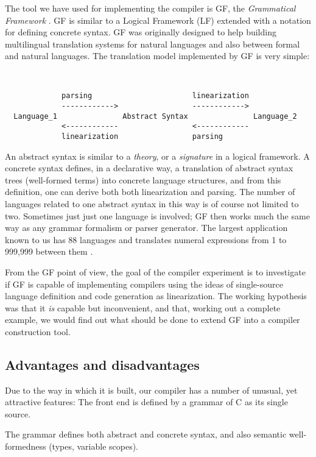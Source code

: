 \documentclass[12pt]{article}
\newcommand{\empha}[1]{{\em #1}}
\begin{document}
The tool we have used for implementing the compiler is
GF, the \empha{Grammatical Framework} \cite{gf-jfp}. GF 
is similar to a Logical Framework (LF) extended with
a notation for defining concrete syntax. GF was originally
designed to help building multilingual
translation systems for natural languages and also
between formal and natural languages. The translation model
implemented by GF is very simple:
\begin{verbatim}


             parsing                       linearization
             ------------>                 ------------>
  Language_1               Abstract Syntax               Language_2
             <------------                 <------------
             linearization                 parsing
\end{verbatim}
An abstract syntax is similar to a \empha{theory}, or a
\empha{signature} in a logical framework. A 
concrete syntax defines, in a declarative way,
a translation of abstract syntax trees (well-formed terms) 
into concrete language structures, and from this definition, one can
derive both both linearization and parsing.
The number of languages related to one abstract syntax in
this way is of course not limited to two. Sometimes just just one
language is involved; 
GF then works much the same way as any grammar formalism or parser
generator. 
The largest application known to us has 88 languages and translates
numeral expressions from 1 to 999,999 between them \cite{gf-homepage}.
 
From the GF point of view, the goal of the compiler experiment
is to investigate if GF is capable of implementing
compilers using the ideas of single-source language definition
and code generation as linearization. The working hypothesis
was that it \textit{is} capable but inconvenient, and that,
working out a complete example, we would find out what 
should be done to extend GF into a compiler construction tool.


\subsection{Advantages and disadvantages}

Due to the way in which it is built, our compiler has
a number of unusual, yet attractive features:
\bequ
The front end is defined by a grammar of C as its single source.

The grammar defines both abstract and concrete syntax, and also
semantic well-formedness (types, variable scopes).
\end{document}
